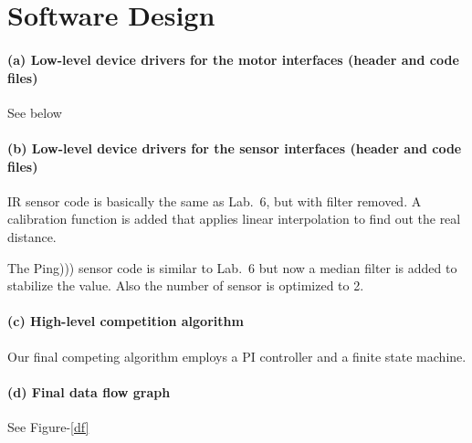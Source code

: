 \documentclass[a4paper]{article}
\begin{document}
\newpage
\section{Software Design}

\lstset{language=C, style=MyCStyle}

\paragraph{(a) Low-level device drivers for the motor interfaces (header and code files) \\}
{
See below


}

\paragraph{(b) Low-level device drivers for the sensor interfaces (header and code files) \\}
{
IR sensor code is basically the same as Lab.\ 6, but with filter removed. A calibration function is added
that applies linear interpolation to find out the real distance.




The Ping))) sensor code is similar to Lab.\ 6 but now a median filter is added to stabilize the value. Also
the number of sensor is optimized to 2.




}

\paragraph{(c) High-level competition algorithm \\}
{
Our final competing algorithm employs a PI controller and a finite state machine.


}

\paragraph{(d) Final data flow graph \\}
See Figure-\ref{df}
\end{document}
